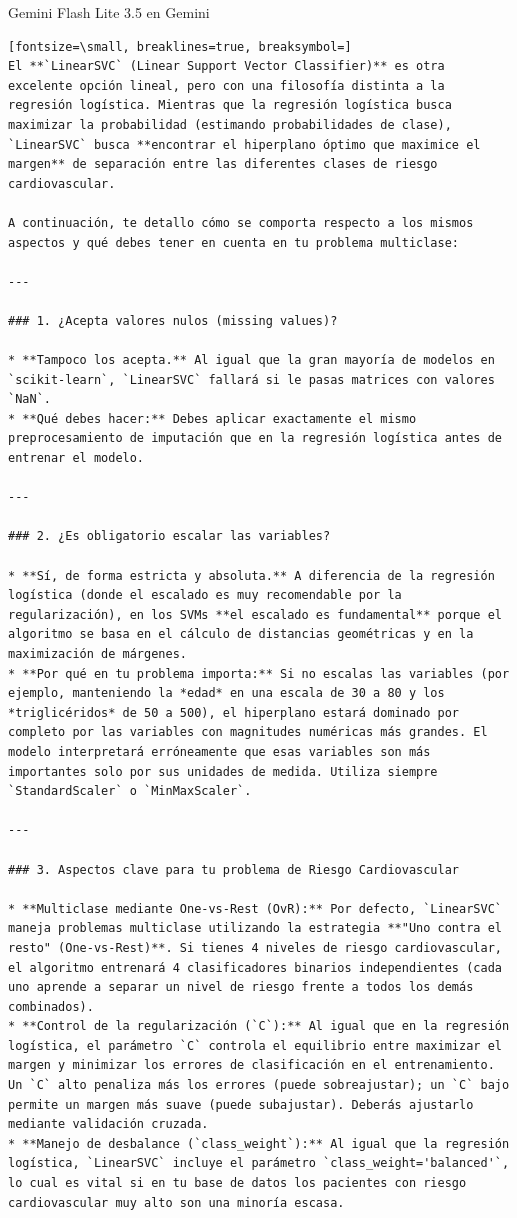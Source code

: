 \documentclass[12pt,a4paper,oneside]{book}
\begin{document}
\begin{iaresp}{Gemini Flash Lite 3.5 en Gemini}
\begin{Verbatim}[fontsize=\small, breaklines=true, breaksymbol=]
El **`LinearSVC` (Linear Support Vector Classifier)** es otra excelente opción lineal, pero con una filosofía distinta a la regresión logística. Mientras que la regresión logística busca maximizar la probabilidad (estimando probabilidades de clase), `LinearSVC` busca **encontrar el hiperplano óptimo que maximice el margen** de separación entre las diferentes clases de riesgo cardiovascular.

A continuación, te detallo cómo se comporta respecto a los mismos aspectos y qué debes tener en cuenta en tu problema multiclase:

---

### 1. ¿Acepta valores nulos (missing values)?

* **Tampoco los acepta.** Al igual que la gran mayoría de modelos en `scikit-learn`, `LinearSVC` fallará si le pasas matrices con valores `NaN`.
* **Qué debes hacer:** Debes aplicar exactamente el mismo preprocesamiento de imputación que en la regresión logística antes de entrenar el modelo.

---

### 2. ¿Es obligatorio escalar las variables?

* **Sí, de forma estricta y absoluta.** A diferencia de la regresión logística (donde el escalado es muy recomendable por la regularización), en los SVMs **el escalado es fundamental** porque el algoritmo se basa en el cálculo de distancias geométricas y en la maximización de márgenes.
* **Por qué en tu problema importa:** Si no escalas las variables (por ejemplo, manteniendo la *edad* en una escala de 30 a 80 y los *triglicéridos* de 50 a 500), el hiperplano estará dominado por completo por las variables con magnitudes numéricas más grandes. El modelo interpretará erróneamente que esas variables son más importantes solo por sus unidades de medida. Utiliza siempre `StandardScaler` o `MinMaxScaler`.

---

### 3. Aspectos clave para tu problema de Riesgo Cardiovascular

* **Multiclase mediante One-vs-Rest (OvR):** Por defecto, `LinearSVC` maneja problemas multiclase utilizando la estrategia **"Uno contra el resto" (One-vs-Rest)**. Si tienes 4 niveles de riesgo cardiovascular, el algoritmo entrenará 4 clasificadores binarios independientes (cada uno aprende a separar un nivel de riesgo frente a todos los demás combinados).
* **Control de la regularización (`C`):** Al igual que en la regresión logística, el parámetro `C` controla el equilibrio entre maximizar el margen y minimizar los errores de clasificación en el entrenamiento. Un `C` alto penaliza más los errores (puede sobreajustar); un `C` bajo permite un margen más suave (puede subajustar). Deberás ajustarlo mediante validación cruzada.
* **Manejo de desbalance (`class_weight`):** Al igual que la regresión logística, `LinearSVC` incluye el parámetro `class_weight='balanced'`, lo cual es vital si en tu base de datos los pacientes con riesgo cardiovascular muy alto son una minoría escasa.


\end{Verbatim}
\end{iaresp}
\end{document}
